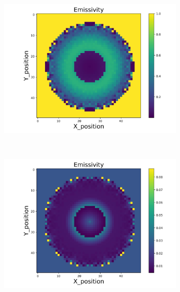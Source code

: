 \begin{figure}[p]
\begin{minipage}{\textwidth}
\begin{subfigure}{0.325\textwidth}
            \includegraphics[width=\textwidth]{figures/raw_data/31/mix/emi_cal.jpg}
        \end{subfigure}
    \end{minipage}\\
    \begin{minipage}{\textwidth}
        \centering
        \begin{subfigure}{0.325\textwidth}
            \centering
            \includegraphics[width=\textwidth]{figures/raw_data/32/mix/emi_cal.jpg}
        \end{subfigure}
        \begin{subfigure}{0.325\textwidth}

\end{subfigure}
\end{minipage}
\end{figure}
